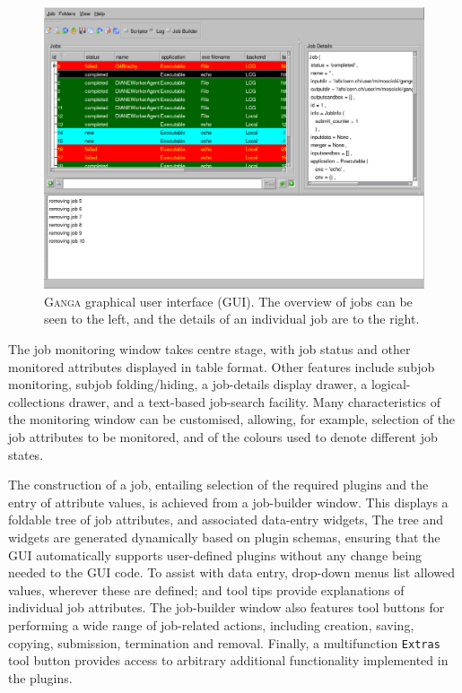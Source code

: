 \documentclass{elsart}
\def\ganga {\textsc{Ganga}\xspace}
\newcommand{\code}[1]{\texttt{#1}}
\begin{document}
\begin{figure}[ht!]
  \centering
  \includegraphics[width=1 \textwidth]{ganga-GUI.png}
  \caption{\ganga graphical user interface (GUI).  The overview of jobs
   can be seen to the left, and the details of an individual job are to
   the right.}
  \label{fig:GUI}
\end{figure}

The job monitoring window takes centre stage,
with job status and other monitored attributes displayed
in table format. Other features include subjob monitoring, subjob  
folding/hiding, a job-details display drawer, a logical-collections  
drawer, and a text-based job-search facility. Many characteristics of the
monitoring window can be customised, allowing, for example, selection of
the job attributes to be monitored, and of the colours used to denote
different job states.

The construction of a job, entailing selection of the required plugins and  
the entry of attribute values, is achieved from a job-builder window. This
displays a foldable tree of job attributes, and associated data-entry
widgets, The tree and widgets are generated dynamically based
on plugin schemas, ensuring that the GUI automatically supports
user-defined plugins without any change being needed to the GUI code.  To
assist with data entry, drop-down menus list allowed values, wherever
these are defined; and tool tips provide explanations of individual job
attributes.  The job-builder window also features tool buttons for
performing a wide range of job-related actions, including
creation, saving, copying, submission, termination and removal.  Finally,
a multifunction \code{Extras} tool button provides access to arbitrary
additional functionality implemented in the plugins.
\end{document}
